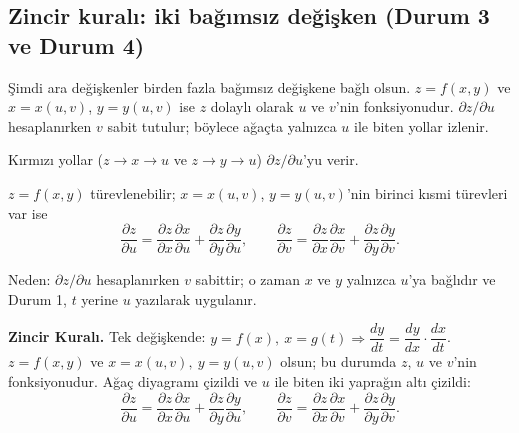 \subsection{Zincir kuralı: iki bağımsız değişken (Durum 3 ve Durum 4)}

Şimdi ara değişkenler birden fazla bağımsız değişkene bağlı olsun. $z=f(x,y)$ ve $x=x(u,v)$, $y=y(u,v)$ ise $z$ dolaylı
olarak $u$ ve $v$'nin fonksiyonudur. $\partial z/\partial u$ hesaplanırken $v$ sabit tutulur; böylece ağaçta yalnızca
$u$ ile biten yollar izlenir.

\begin{center}
\end{center}
Kırmızı yollar ($z\to x\to u$ ve $z\to y\to u$) $\partial z/\partial u$'yu verir.

\begin{teorem}
$z=f(x,y)$ türevlenebilir; $x=x(u,v)$, $y=y(u,v)$'nin birinci kısmi türevleri var ise
\[
\frac{\partial z}{\partial u}=\frac{\partial z}{\partial x}\frac{\partial x}{\partial u}+\frac{\partial z}{\partial y}\frac{\partial y}{\partial u},
\qquad
\frac{\partial z}{\partial v}=\frac{\partial z}{\partial x}\frac{\partial x}{\partial v}+\frac{\partial z}{\partial y}\frac{\partial y}{\partial v}.
\]
\end{teorem}
Neden: $\partial z/\partial u$ hesaplanırken $v$ sabittir; o zaman $x$ ve $y$ yalnızca $u$'ya bağlıdır ve Durum 1, $t$
yerine $u$ yazılarak uygulanır.

\begin{tahta}
\textbf{Zincir Kuralı.} Tek değişkende: $y=f(x),\ x=g(t)\Rightarrow \dfrac{dy}{dt}=\dfrac{dy}{dx}\cdot\dfrac{dx}{dt}$.
$z=f(x,y)$ ve $x=x(u,v),\ y=y(u,v)$ olsun; bu durumda $z$, $u$ ve $v$'nin fonksiyonudur. Ağaç diyagramı çizildi ve $u$ ile
biten iki yaprağın altı çizildi:
\[
\frac{\partial z}{\partial u}=\frac{\partial z}{\partial x}\frac{\partial x}{\partial u}+\frac{\partial z}{\partial y}\frac{\partial y}{\partial u},\qquad
\frac{\partial z}{\partial v}=\frac{\partial z}{\partial x}\frac{\partial x}{\partial v}+\frac{\partial z}{\partial y}\frac{\partial y}{\partial v}.
\]
\end{tahta}

